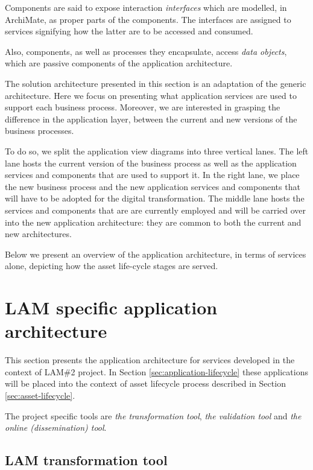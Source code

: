 	Components are said to expose interaction \textit{interfaces} which are modelled, in ArchiMate, as proper parts of the components. The interfaces are assigned to services signifying how the latter are to be accessed and consumed. 
	
	Also, components, as well as processes they encapsulate, access \textit{data objects}, which are passive components of the application architecture.

	The solution architecture presented in this section is an adaptation of the generic architecture. Here we focus on presenting what application services are used to support each business process. Moreover, we are interested in grasping the difference in the application layer, between the current and new versions of the business processes. 
	
	To do so, we split the application view diagrams into three vertical lanes. The left lane hosts the current version of the business process as well as the application services and components that are used to support it. In the right lane, we place the new business process and the new application services and components that will have to be adopted for the digital transformation. The middle lane hosts the services and components that are are currently employed and will be carried over into the new application architecture: they are common to both the current and new architectures.

	Below we present an overview of the application architecture, in terms of services alone, depicting how the asset life-cycle stages are served.	
	
	\section{LAM specific application architecture}

	This section presents the application architecture for services developed in the context of LAM\#2 project. In Section \ref{sec:application-lifecycle} these applications will be placed into the context of asset lifecycle process described in Section \ref{sec:asset-lifecycle}. 
	
	The project specific tools are \textit{the transformation tool}, \textit{the validation tool} and \textit{the online (dissemination) tool}.
	
	\subsection{LAM transformation tool}
	\label{sec:transformation-tool}
		
